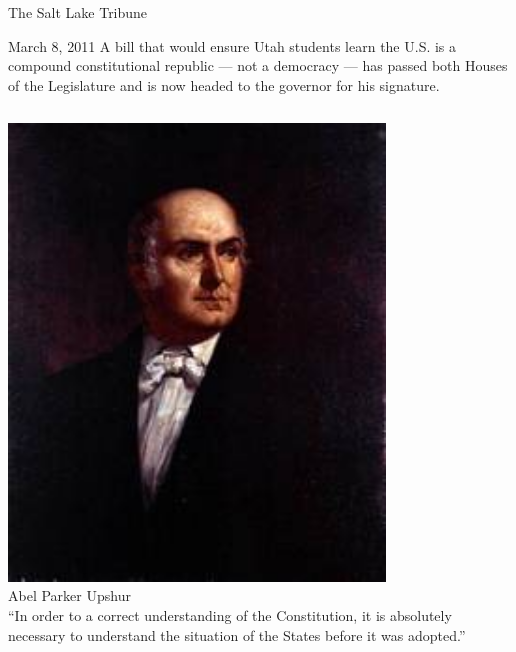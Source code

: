 \begin{frame}{The Salt Lake Tribune}
    \begin{block}{March 8, 2011}
    A bill that would ensure Utah students learn the U.S. is a compound constitutional republic --- not a democracy --- has passed both
    Houses of the Legislature and is now headed to the governor for his signature.
    \end{block}
\end{frame}

\begin{frame}
    \begin{columns}[onlytextwidth]
            \centering
            \includegraphics[width=0.75\textwidth]{img/upshur.jpg} \\
            Abel Parker Upshur \\

            ``In order to a correct understanding of the Constitution, it is absolutely necessary to understand the situation of the States before it was adopted.''
    \end{columns}
\end{frame}

